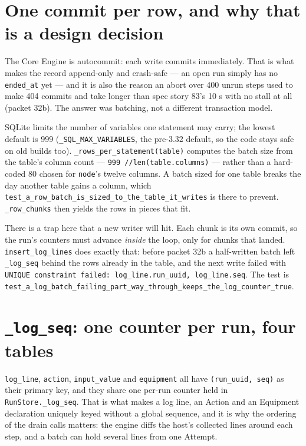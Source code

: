 \section{One commit per row, and why that is a design decision}

The Core Engine is autocommit: each write commits immediately. That is what makes the record
append-only and crash-safe --- an open run simply has no \texttt{ended\_at} yet --- and it is also the
reason an abort over 400 unrun steps used to make 404 commits and take longer than spec story 83's 10 s with
no stall at all (packet 32b). The answer was batching, not a different transaction model.

SQLite limits the number of variables one statement may carry; the lowest default is 999
(\texttt{\_\allowbreak{}SQL\_\allowbreak{}MAX\_\allowbreak{}VARIABLES}, the pre-3.32 default, so the code stays safe on old builds too).
\texttt{\_\allowbreak{}rows\_\allowbreak{}per\_\allowbreak{}statement(table)} computes the batch size from the table's column count ---
\texttt{999 /\allowbreak/\allowbreak len(table.columns)} --- rather than a hard-coded 80 chosen for \texttt{node}'s twelve
columns. A batch sized for one table breaks the day another table gains a column, which
\texttt{test\_\allowbreak{}a\_\allowbreak{}row\_\allowbreak{}batch\_\allowbreak{}is\_\allowbreak{}sized\_\allowbreak{}to\_\allowbreak{}the\_\allowbreak{}table\_\allowbreak{}it\_\allowbreak{}writes} is there to prevent.
\texttt{\_row\_chunks} then yields the rows in pieces that fit.

There is a trap here that a new writer will hit. Each chunk is its own commit, so the run's counters must
advance \emph{inside} the loop, only for chunks that landed. \texttt{insert\_log\_lines} does exactly
that: before packet 32b a half-written batch left \texttt{\_log\_seq} behind the rows already in the
table, and the next write failed with \texttt{UNIQUE constraint failed: log\_line.run\_uuid,
log\_line.seq}. The test is
\texttt{test\_\allowbreak{}a\_\allowbreak{}log\_\allowbreak{}batch\_\allowbreak{}failing\_\allowbreak{}part\_\allowbreak{}way\_\allowbreak{}through\_\allowbreak{}keeps\_\allowbreak{}the\_\allowbreak{}log\_\allowbreak{}counter\_\allowbreak{}true}.

\section{\texttt{\_log\_seq}: one counter per run, four tables}

\texttt{log\_line}, \texttt{action}, \texttt{input\_value} and \texttt{equipment} all have
\texttt{(run\_uuid, seq)} as their primary key, and they share one per-run counter held in
\texttt{RunStore.\_log\_seq}. That is what makes a log line, an Action and an Equipment declaration
uniquely keyed without a global sequence, and it is why the ordering of the drain calls matters: the
engine diffs the host's collected lines around each step, and a batch can hold several lines from one
Attempt.

